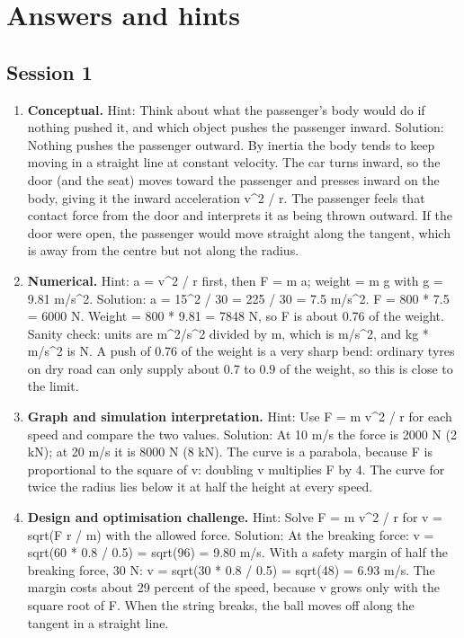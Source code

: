 \documentclass[11pt,a4paper]{article}
\begin{document}
\section{Answers and hints}

\subsection*{Session 1}
\begin{enumerate}[nosep]
\item \textbf{Conceptual.} Hint: Think about what the passenger's body would do if nothing pushed it, and which object pushes the passenger inward. Solution: Nothing pushes the passenger outward. By inertia the body tends to keep moving in a straight line at constant velocity. The car turns inward, so the door (and the seat) moves toward the passenger and presses inward on the body, giving it the inward acceleration v\textasciicircum{}2 / r. The passenger feels that contact force from the door and interprets it as being thrown outward. If the door were open, the passenger would move straight along the tangent, which is away from the centre but not along the radius.
\item \textbf{Numerical.} Hint: a = v\textasciicircum{}2 / r first, then F = m a; weight = m g with g = 9.81 m/s\textasciicircum{}2. Solution: a = 15\textasciicircum{}2 / 30 = 225 / 30 = 7.5 m/s\textasciicircum{}2. F = 800 * 7.5 = 6000 N. Weight = 800 * 9.81 = 7848 N, so F is about 0.76 of the weight. Sanity check: units are m\textasciicircum{}2/s\textasciicircum{}2 divided by m, which is m/s\textasciicircum{}2, and kg * m/s\textasciicircum{}2 is N. A push of 0.76 of the weight is a very sharp bend: ordinary tyres on dry road can only supply about 0.7 to 0.9 of the weight, so this is close to the limit.
\item \textbf{Graph and simulation interpretation.} Hint: Use F = m v\textasciicircum{}2 / r for each speed and compare the two values. Solution: At 10 m/s the force is 2000 N (2 kN); at 20 m/s it is 8000 N (8 kN). The curve is a parabola, because F is proportional to the square of v: doubling v multiplies F by 4. The curve for twice the radius lies below it at half the height at every speed.
\item \textbf{Design and optimisation challenge.} Hint: Solve F = m v\textasciicircum{}2 / r for v = sqrt(F r / m) with the allowed force. Solution: At the breaking force: v = sqrt(60 * 0.8 / 0.5) = sqrt(96) = 9.80 m/s. With a safety margin of half the breaking force, 30 N: v = sqrt(30 * 0.8 / 0.5) = sqrt(48) = 6.93 m/s. The margin costs about 29 percent of the speed, because v grows only with the square root of F. When the string breaks, the ball moves off along the tangent in a straight line.
\end{enumerate}
\end{document}

